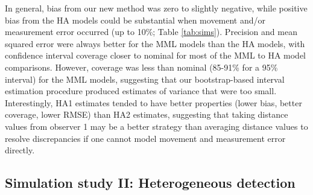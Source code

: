 \documentclass[aoas,preprint]{imsart}
\numberwithin{equation}{section}
\theoremstyle{plain}
\begin{document}
In general, bias from our new method was zero to slightly negative, while positive bias from the HA models could be substantial when movement and/or measurement error occurred (up to 10\%; Table \ref{tab:sims}).  Precision and mean squared error were always better for the MML models than the HA models, with  confidence interval coverage closer to nominal for most of the MML to HA model comparisons.  However, coverage was less than nominal (85-91\% for a 95\% interval) for the MML models, suggesting that our bootstrap-based interval estimation procedure produced estimates of variance that were too small.  Interestingly, HA1 estimates tended to have better properties (lower bias, better coverage, lower RMSE) than HA2 estimates, suggesting that taking distance values from observer 1 may be a better strategy than averaging distance values to resolve discrepancies if one cannot model movement and measurement error directly.


\subsection{Simulation study II: Heterogeneous detection}
\end{document}
